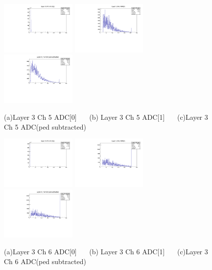 \documentclass[a4paper,11pt]{article}
\theoremstyle{mytheor}
\begin{document}
\begin{figure}[H] 
\vspace*{-0.3cm} 
\includegraphics[width=0.33\textwidth,scale=0.5,trim=0 0 0 0,clip]{plotsdir/file0_test-Layer3_Ch5_adc0-1.pdf} 
\includegraphics[width=0.33\textwidth,scale=0.5,trim=0 0 0 0,clip]{plotsdir/file0_test-Layer3_Ch5_adc1-1.pdf} 
\includegraphics[width=0.33\textwidth,scale=0.5,trim=0 0 0 0,clip]{plotsdir/file0_test-Layer3_Ch5_adcPedsub-1.pdf} 
\caption{(a)Layer 3 Ch 5 ADC[0] ~~~(b) Layer 3 Ch 5 ADC[1] ~~~(c)Layer 3 Ch 5 ADC(ped subtracted) } 
\end{figure} 
\begin{figure}[H] 
\vspace*{-0.3cm} 
\includegraphics[width=0.33\textwidth,scale=0.5,trim=0 0 0 0,clip]{plotsdir/file0_test-Layer3_Ch6_adc0-1.pdf} 
\includegraphics[width=0.33\textwidth,scale=0.5,trim=0 0 0 0,clip]{plotsdir/file0_test-Layer3_Ch6_adc1-1.pdf} 
\includegraphics[width=0.33\textwidth,scale=0.5,trim=0 0 0 0,clip]{plotsdir/file0_test-Layer3_Ch6_adcPedsub-1.pdf} 
\caption{(a)Layer 3 Ch 6 ADC[0] ~~~(b) Layer 3 Ch 6 ADC[1] ~~~(c)Layer 3 Ch 6 ADC(ped subtracted) } 
\end{figure} 
\end{document}

